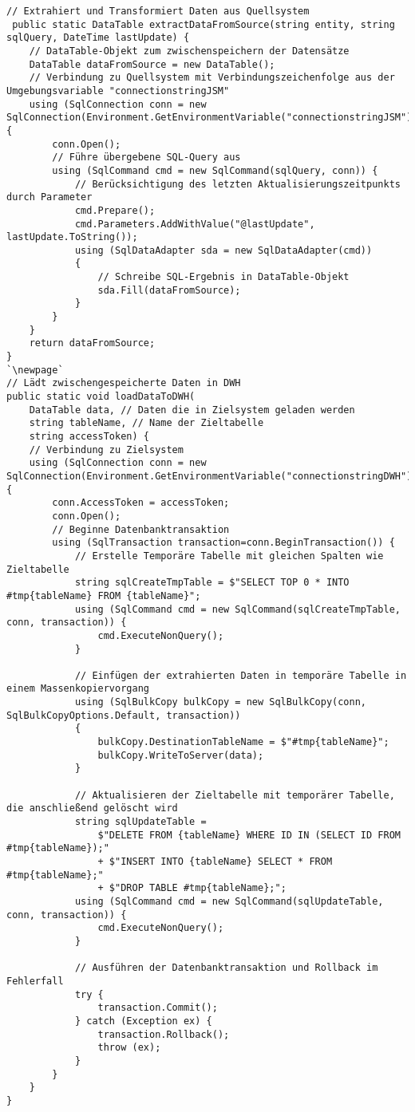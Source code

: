 \begin{lstlisting}[caption=Quellcode für die Datenintegration mit Azure Functions,captionpos=b,label={lst:azFunc},escapeinside=``]
// Extrahiert und Transformiert Daten aus Quellsystem
 public static DataTable extractDataFromSource(string entity, string sqlQuery, DateTime lastUpdate) {
    // DataTable-Objekt zum zwischenspeichern der Datensätze
    DataTable dataFromSource = new DataTable();
    // Verbindung zu Quellsystem mit Verbindungszeichenfolge aus der Umgebungsvariable "connectionstringJSM"
    using (SqlConnection conn = new SqlConnection(Environment.GetEnvironmentVariable("connectionstringJSM"))) {
        conn.Open();
        // Führe übergebene SQL-Query aus
        using (SqlCommand cmd = new SqlCommand(sqlQuery, conn)) {
            // Berücksichtigung des letzten Aktualisierungszeitpunkts durch Parameter
            cmd.Prepare();
            cmd.Parameters.AddWithValue("@lastUpdate", lastUpdate.ToString());
            using (SqlDataAdapter sda = new SqlDataAdapter(cmd))
            {
                // Schreibe SQL-Ergebnis in DataTable-Objekt
                sda.Fill(dataFromSource);
            }
        }
    }
    return dataFromSource;
}
`\newpage`
// Lädt zwischengespeicherte Daten in DWH
public static void loadDataToDWH(
    DataTable data, // Daten die in Zielsystem geladen werden
    string tableName, // Name der Zieltabelle
    string accessToken) {
    // Verbindung zu Zielsystem
    using (SqlConnection conn = new SqlConnection(Environment.GetEnvironmentVariable("connectionstringDWH"))) {
        conn.AccessToken = accessToken;
        conn.Open();
        // Beginne Datenbanktransaktion
        using (SqlTransaction transaction=conn.BeginTransaction()) {
            // Erstelle Temporäre Tabelle mit gleichen Spalten wie Zieltabelle
            string sqlCreateTmpTable = $"SELECT TOP 0 * INTO #tmp{tableName} FROM {tableName}";
            using (SqlCommand cmd = new SqlCommand(sqlCreateTmpTable, conn, transaction)) {
                cmd.ExecuteNonQuery();
            }
            
            // Einfügen der extrahierten Daten in temporäre Tabelle in einem Massenkopiervorgang
            using (SqlBulkCopy bulkCopy = new SqlBulkCopy(conn, SqlBulkCopyOptions.Default, transaction))
            {
                bulkCopy.DestinationTableName = $"#tmp{tableName}";
                bulkCopy.WriteToServer(data);
            }
            
            // Aktualisieren der Zieltabelle mit temporärer Tabelle, die anschließend gelöscht wird
            string sqlUpdateTable = 
                $"DELETE FROM {tableName} WHERE ID IN (SELECT ID FROM #tmp{tableName});"
                + $"INSERT INTO {tableName} SELECT * FROM #tmp{tableName};"
                + $"DROP TABLE #tmp{tableName};";
            using (SqlCommand cmd = new SqlCommand(sqlUpdateTable, conn, transaction)) {
                cmd.ExecuteNonQuery();
            }
            
            // Ausführen der Datenbanktransaktion und Rollback im Fehlerfall
            try {
                transaction.Commit();
            } catch (Exception ex) {
                transaction.Rollback();
                throw (ex);
            }
        }
    }
}
\end{lstlisting}